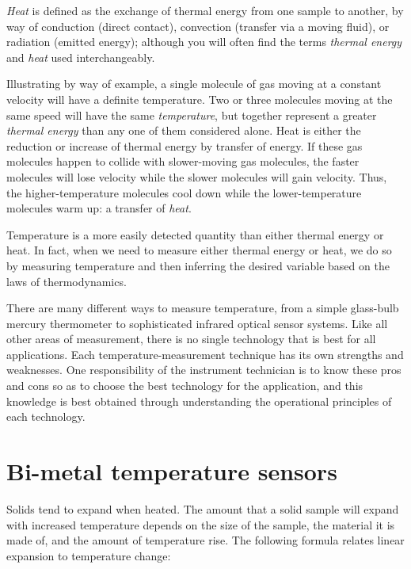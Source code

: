 \textit{Heat} is defined as the exchange of thermal energy from one sample to another, by way of conduction (direct contact), convection (transfer via a moving fluid), or radiation (emitted energy); although you will often find the terms \textit{thermal energy} and \textit{heat} used interchangeably.        

\vskip 10pt

Illustrating by way of example, a single molecule of gas moving at a constant velocity will have a definite temperature.  Two or three molecules moving at the same speed will have the same \textit{temperature}, but together represent a greater \textit{thermal energy} than any one of them considered alone.  Heat is either the reduction or increase of thermal energy by transfer of energy.  If these gas molecules happen to collide with slower-moving gas molecules, the faster molecules will lose velocity while the slower molecules will gain velocity.  Thus, the higher-temperature molecules cool down while the lower-temperature molecules warm up: a transfer of \textit{heat}.

\vskip 10pt

Temperature is a more easily detected quantity than either thermal energy or heat.  In fact, when we need to measure either thermal energy or heat, we do so by measuring temperature and then inferring the desired variable based on the laws of thermodynamics.  

There are many different ways to measure temperature, from a simple glass-bulb mercury thermometer to sophisticated infrared optical sensor systems.  Like all other areas of measurement, there is no single technology that is best for all applications.  Each temperature-measurement technique has its own strengths and weaknesses.  One responsibility of the instrument technician is to know these pros and cons so as to choose the best technology for the application, and this knowledge is best obtained through understanding the operational principles of each technology.





\filbreak
\section{Bi-metal temperature sensors}

Solids tend to expand when heated.  The amount that a solid sample will expand with increased temperature depends on the size of the sample, the material it is made of, and the amount of temperature rise.  The following formula relates linear expansion to temperature change:

